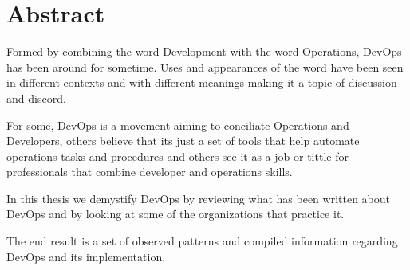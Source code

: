 \chapter*{Abstract}

Formed by combining the word Development with the word Operations, DevOps has been around for sometime. Uses and appearances of the word have been seen in different contexts and with different meanings making it a topic of discussion and discord. 

For some, DevOps is a movement aiming to conciliate Operations and Developers, others believe that its just a set of tools that help automate operations tasks and procedures and others see it as a job or tittle for professionals that combine developer and operations skills.

In this thesis we demystify DevOps by reviewing what has been written about DevOps and by looking at some of the organizations that practice it.

The end result is a set of observed patterns and compiled information regarding DevOps and its implementation.